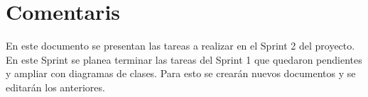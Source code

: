\section{Comentaris}




En este documento se presentan las tareas a realizar en el Sprint 2 del proyecto. En este Sprint se planea terminar las tareas del Sprint 1 que quedaron pendientes y ampliar con diagramas de clases. Para esto se crearán nuevos documentos y se editarán los anteriores.
